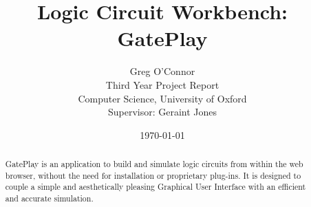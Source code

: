 \documentclass[a4paper,notitlepage]{report}
\begin{document}
\title{Logic Circuit Workbench: GatePlay}
\author{Greg O'Connor \\
        Third Year Project Report \\
		Computer Science, University of Oxford \\
		Supervisor: Geraint Jones}
\date{\today}
\maketitle

\begin{abstract}
GatePlay is an application to build and simulate logic circuits from within the web browser, without the need for installation or proprietary plug-ins. It is designed to couple a simple and aesthetically pleasing Graphical User Interface with an efficient and accurate simulation.
\end{abstract}
\clearpage

\tableofcontents
\clearpage


\clearpage

\clearpage

\clearpage

\clearpage

\clearpage

\clearpage

\clearpage

\end{document}
